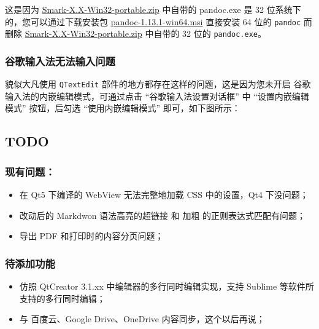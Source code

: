 这是因为
\href{http://pan.baidu.com/s/1ntMCVFV}{Smark-X.X-Win32-portable.zip}
中自带的 pandoc.exe 是 32 位系统下的，您可以通过下载安装包
\href{http://pan.baidu.com/s/1ntMCVFV\#path=\%252Fsmark}{pandoc-1.13.1-win64.msi}
直接安装 64 位的 \texttt{pandoc} 而删除
\href{http://pan.baidu.com/s/1ntMCVFV}{Smark-X.X-Win32-portable.zip}
中自带的 32 位的 \texttt{pandoc.exe}。

\hypertarget{ux8c37ux6b4cux8f93ux5165ux6cd5ux65e0ux6cd5ux8f93ux5165ux95eeux9898}{%
\subsubsection{谷歌输入法无法输入问题}\label{ux8c37ux6b4cux8f93ux5165ux6cd5ux65e0ux6cd5ux8f93ux5165ux95eeux9898}}

貌似大凡使用 \texttt{QTextEdit}
部件的地方都存在这样的问题，这是因为您未开启
谷歌输入法的内嵌编辑模式，可通过点击 ``谷歌输入法设置对话框'' 中
``设置内嵌编辑模式'' 按钮，后勾选 ``使用内嵌编辑模式''
即可，如下图所示：

\hypertarget{todo}{%
\subsection{TODO}\label{todo}}

\hypertarget{ux73b0ux6709ux95eeux9898}{%
\subsubsection{现有问题：}\label{ux73b0ux6709ux95eeux9898}}

\begin{itemize}
\tightlist
\item
  在 Qt5 下编译的 WebView 无法完整地加载 CSS 中的设置，Qt4 下没问题；
\item
  改动后的 Markdwon 语法高亮的超链接 和 加粗 的正则表达式匹配有问题；
\item
  导出 PDF 和打印时的内容分页问题；
\end{itemize}

\hypertarget{ux5f85ux6dfbux52a0ux529fux80fd}{%
\subsubsection{待添加功能}\label{ux5f85ux6dfbux52a0ux529fux80fd}}

\begin{itemize}
\tightlist
\item
  仿照 QtCreator 3.1.xx 中编辑器的多行同时编辑实现，支持 Sublime
  等软件所支持的多行同时编辑；
\item
  与 百度云、Google Drive、OneDrive 内容同步，这个以后再说；
\end{itemize}

